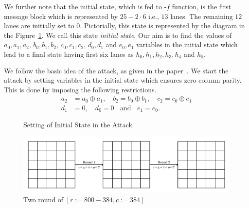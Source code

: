 We further note that the initial state, which is fed to \KECCAK-$f$ function, is the first message block which is represented by $25-2\cdot 6$ i.e., $13$ lanes. The remaining $12$ lanes are initially set to $0$. Pictorially, this state is represented by the diagram in the Figure~\ref{initial_state}. We call this state \emph{initial state}.
Our aim is to find the values of $a_0, a_1, a_2$, $b_0, b_1, b_2$, $c_0, c_1, c_2$, $d_0, d_1$ and $e_0, e_1$ variables in the initial state which lead to a final state having first six lanes as $h_0, h_1, h_2,h_3, h_4$ and $h_5$. 

We follow the basic idea of the attack, as given in the paper~\cite{naya2011practical}.
We start the attack by setting variables in the initial state which ensures zero column parity. 
This is done by imposing the following restrictions.
\begin{align}\nonumber
a_2 &= a_0 \oplus a_1,\quad b_2 = b_0 \oplus b_1, \quad c_2 = c_0 \oplus c_1\\ \label{cond_state1}
d_1 & = 0,\quad d_0 = 0\;\;\text{ and }\;\; e_1 = e_0. 
\end{align}

\begin{figure}
\begin{center}
\end{center}
\caption{Setting of Initial State in the Attack\label{initial_state}}
\end{figure}

\begin{figure}[H]
    \centering
    \includegraphics[scale=0.7]{keccak2Rstate.pdf}
    \caption{Two round of \KECCAK$[r:=800-384, c:=384]$}
    \label{two_rnd}
\end{figure}


